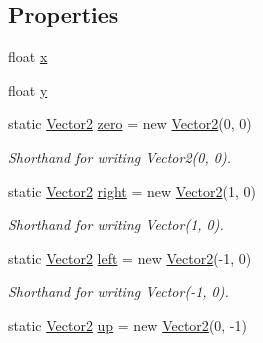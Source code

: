 \subsection*{Properties}
\begin{DoxyCompactItemize}
\item 
float \mbox{\hyperlink{struct_retro_engine_1_1_vector2_a4f038db4bba5d34aa5f9c5349fe5a993}{x}}
\item 
float \mbox{\hyperlink{struct_retro_engine_1_1_vector2_aae2478fc8e97af99443c2ad746050ee3}{y}}
\item 
static \mbox{\hyperlink{struct_retro_engine_1_1_vector2}{Vector2}} \mbox{\hyperlink{struct_retro_engine_1_1_vector2_a1a2b5353a4fcbe21919adb539a8f9784}{zero}} = new \mbox{\hyperlink{struct_retro_engine_1_1_vector2}{Vector2}}(0, 0)
\begin{DoxyCompactList}\small\item\em Shorthand for writing Vector2(0, 0). \end{DoxyCompactList}\item 
static \mbox{\hyperlink{struct_retro_engine_1_1_vector2}{Vector2}} \mbox{\hyperlink{struct_retro_engine_1_1_vector2_ab51bc58fb69617773c645ea72d4e04a1}{right}} = new \mbox{\hyperlink{struct_retro_engine_1_1_vector2}{Vector2}}(1, 0)
\begin{DoxyCompactList}\small\item\em Shorthand for writing Vector(1, 0). \end{DoxyCompactList}\item 
static \mbox{\hyperlink{struct_retro_engine_1_1_vector2}{Vector2}} \mbox{\hyperlink{struct_retro_engine_1_1_vector2_ac708d17f8f7cf45408d1228d29f35d97}{left}} = new \mbox{\hyperlink{struct_retro_engine_1_1_vector2}{Vector2}}(-\/1, 0)
\begin{DoxyCompactList}\small\item\em Shorthand for writing Vector(-\/1, 0). \end{DoxyCompactList}\item 
static \mbox{\hyperlink{struct_retro_engine_1_1_vector2}{Vector2}} \mbox{\hyperlink{struct_retro_engine_1_1_vector2_a3d421fa8ce90b65d8fc62c7634c4ddea}{up}} = new \mbox{\hyperlink{struct_retro_engine_1_1_vector2}{Vector2}}(0, -\/1)

\end{DoxyCompactItemize}
